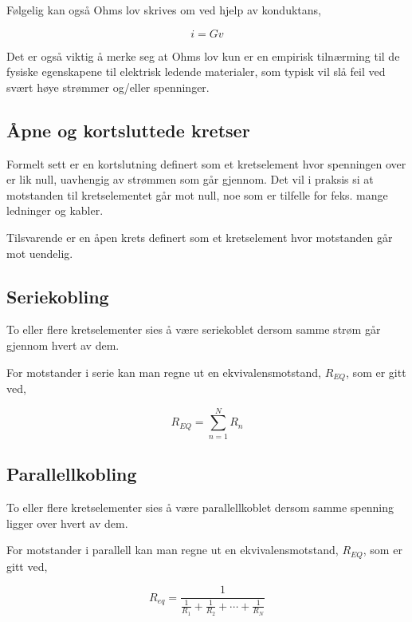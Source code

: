 \documentclass[norsk, a4paper, 12pt, twoside, titlepage]{article}
\begin{document}
Følgelig kan også Ohms lov skrives om ved hjelp av konduktans,

\begin{equation}
i = Gv
\end{equation}

Det er også viktig å merke seg at Ohms lov kun er en empirisk
tilnærming til de fysiske egenskapene til elektrisk ledende
materialer, som typisk vil slå feil ved svært høye strømmer og/eller
spenninger.


\subsection{Åpne og kortsluttede kretser}
Formelt sett er en
kortslutning definert som
et kretselement hvor spenningen over er lik null, uavhengig av
strømmen som går gjennom.  Det vil i praksis si at motstanden til
kretselementet går mot null, noe som er tilfelle for feks. mange
ledninger og kabler.

Tilsvarende er en åpen krets definert som et
kretselement hvor motstanden går mot uendelig.


\subsection{Seriekobling}
To eller flere kretselementer sies å være seriekoblet dersom samme
strøm går gjennom hvert av dem.

For motstander i serie kan man regne ut en ekvivalensmotstand,
$R_{EQ}$, som er gitt ved,

\begin{equation}
R_{EQ} = \sum_{n=1}^{N}R_{n}
\end{equation}


\subsection{Parallellkobling}
To eller flere kretselementer sies å være parallellkoblet dersom samme
spenning ligger over hvert av dem.

For motstander i parallell kan man regne ut en ekvivalensmotstand,
$R_{EQ}$, som er gitt ved,

\begin{equation}
R_{eq} = \frac{1}{\frac{1}{R_{1}} + \frac{1}{R_{2}} + \cdots + \frac{1}{R_{N}}}
\end{equation}
\end{document}
